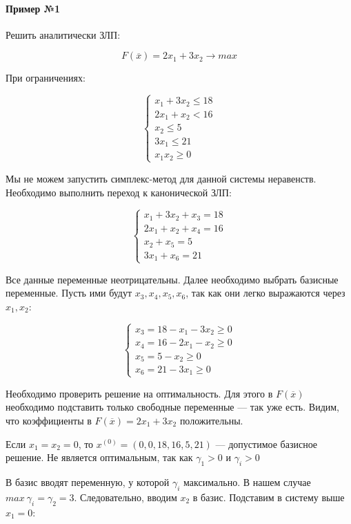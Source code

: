 \documentclass{article}
\begin{document}
\paragraph{Пример №1}

Решить аналитически ЗЛП:

$$
F(\overline{x}) = 2x_1 + 3x_2 \to max
$$

При ограничениях:

$$
\begin{cases}
    x_1 + 3x_2 \le 18 \\
    2x_1 + x_2 < 16 \\
    x_2 \le 5 \\
    3x_1 \le 21 \\
    x_1 x_2 \ge 0  
\end{cases}
$$

Мы не можем запустить симплекс-метод для данной системы неравенств. Необходимо выполнить переход к канонической ЗЛП:

$$
\begin{cases}
  x_1 + 3x_2 + x_3 = 18 \\
  2x_1 + x_2 + x_4 = 16 \\
  x_2 + x_5 = 5 \\
  3x_1 + x_6 = 21  
\end{cases}
$$

Все данные переменные неотрицательны. Далее необходимо выбрать базисные переменные. Пусть ими будут $x_3, x_4, x_5, x_6$, так как они легко выражаются через $x_1, x_2$:

$$
\begin{cases}
    x_3 = 18 - x_1 - 3x_2 \ge 0 \\
    x_4 = 16 - 2x_1 - x_2 \ge 0 \\
    x_5 = 5 - x_2 \ge 0 \\
    x_6 = 21 - 3x_1 \ge 0
\end{cases}
$$

Необходимо проверить решение на оптимальность. Для этого в $F(\overline{x})$ необходимо подставить только свободные переменные — так уже есть. Видим, что коэффициенты в $F(\overline{x}) = 2x_1 + 3x_2$ положительны.

Если $x_1 = x_2 = 0$, то $x^{(0)} = (0, 0, 18, 16, 5, 21)$ — допустимое базисное решение. Не является оптимальным, так как $\gamma_1 > 0$ и $\gamma_i > 0$

В базис вводят переменную, у которой $\gamma_i$ максимально. В нашем случае $max \ \gamma_i = \gamma_2 = 3$. Следовательно, вводим $x_2$ в базис. Подставим в систему выше $x_1 = 0$:
\end{document}
